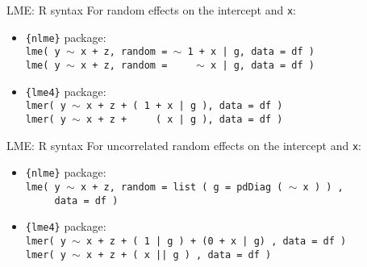 \documentclass{beamer}
\begin{document}
\begin{frame}{LME: R syntax}
\small 
For random effects on the intercept and \texttt{x}: \\
\bigskip
\begin{itemize}
    \item \texttt{\{nlme\}} package: \\ \medskip
    \texttt{lme( y $\sim$ x + z, random = $\sim$ 1 + x | g, data = df )}\\
    \texttt{lme( y $\sim$ x + z, random =~~~~~$\sim$ x | g, data = df )}
    \bigskip
    \item \texttt{\{lme4\}} package: \\ \medskip
    \texttt{lmer( y $\sim$ x + z + ( 1 + x | g ), data = df )} \\
    \texttt{lmer( y $\sim$ x + z + ~~~ ( x | g ), data = df )}
\end{itemize}
\end{frame}
\begin{frame}{LME: R syntax}
\small 
For uncorrelated random effects on the intercept and \texttt{x}: \\
\bigskip
\begin{itemize}
    \item \texttt{\{nlme\}} package: \\ \medskip
    \texttt{lme( y $\sim$ x + z, random = list ( g = pdDiag ( $\sim$ x ) ) , \\~~~~~data = df )}
    \bigskip
    \item \texttt{\{lme4\}} package: \\ \medskip
    \texttt{lmer( y $\sim$ x + z + ( 1 | g ) + (0 + x | g) , data = df )} \\
    \texttt{lmer( y $\sim$ x + z + ( x || g ) , data = df )}
\end{itemize}
\end{frame}
\end{document}
